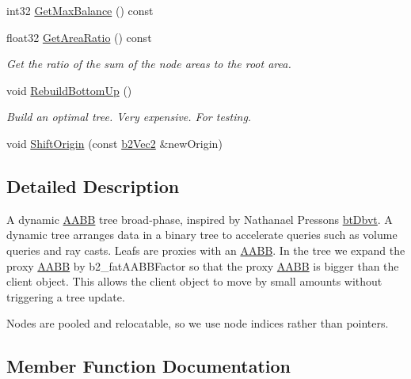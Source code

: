 \begin{DoxyCompactItemize}
\item 
int32 \hyperlink{classb2DynamicTree_a3feab170229e0acd17f6a4ad3fca406e}{Get\+Max\+Balance} () const
\item 
\mbox{\label{classb2DynamicTree_a87da9819c4f190faec38f7fe4608caae}} 
float32 \hyperlink{classb2DynamicTree_a87da9819c4f190faec38f7fe4608caae}{Get\+Area\+Ratio} () const
\begin{DoxyCompactList}\small\item\em Get the ratio of the sum of the node areas to the root area. \end{DoxyCompactList}\item 
\mbox{\label{classb2DynamicTree_abd146017cfec1cf5ea7b87331f30a3ff}} 
void \hyperlink{classb2DynamicTree_abd146017cfec1cf5ea7b87331f30a3ff}{Rebuild\+Bottom\+Up} ()
\begin{DoxyCompactList}\small\item\em Build an optimal tree. Very expensive. For testing. \end{DoxyCompactList}\item 
void \hyperlink{classb2DynamicTree_af37ddfed6a5da97d5a78b09918d19ceb}{Shift\+Origin} (const \hyperlink{structb2Vec2}{b2\+Vec2} \&new\+Origin)
\end{DoxyCompactItemize}


\subsection{Detailed Description}
A dynamic \hyperlink{classAABB}{A\+A\+BB} tree broad-\/phase, inspired by Nathanael Presson\textquotesingle{}s \hyperlink{structbtDbvt}{bt\+Dbvt}. A dynamic tree arranges data in a binary tree to accelerate queries such as volume queries and ray casts. Leafs are proxies with an \hyperlink{classAABB}{A\+A\+BB}. In the tree we expand the proxy \hyperlink{classAABB}{A\+A\+BB} by b2\+\_\+fat\+A\+A\+B\+B\+Factor so that the proxy \hyperlink{classAABB}{A\+A\+BB} is bigger than the client object. This allows the client object to move by small amounts without triggering a tree update.

Nodes are pooled and relocatable, so we use node indices rather than pointers. 

\subsection{Member Function Documentation}
\mbox{\label{classb2DynamicTree_ae3c7dc771d596f1f95fd3a3d7f2f3e97}} 

